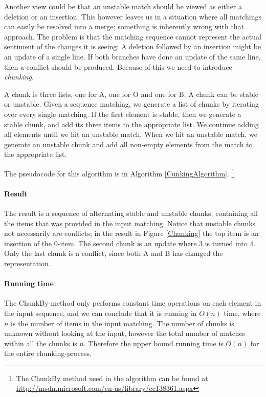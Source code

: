 \documentclass[11pt]{article}
\begin{document}
Another view could be that an unstable match should be viewed as either a deletion or an insertion. This however leaves us in a situation where all matchings can easily be resolved into a merge; something is inherently wrong with that approach. The problem is that the matching sequence cannot represent the actual sentiment of the changes it is seeing: A deletion followed by an insertion might be an update of a single line. If both branches have done an update of the same line, then a conflict should be produced. Because of this we need to introduce \textit{chunking}.

A chunk is three lists, one for A, one for O and one for B. A chunk can be stable or unstable. Given a sequence matching, we generate a list of chunks by iterating over every single matching. If the first element is stable, then we generate a stable chunk, and add its three items to the appropriate list. We continue adding all elements until we hit an unstable match. When we hit an unstable match, we generate an unstable chunk and add all non-empty elements from the match to the appropriate list.

The pseudocode for this algorithm is in Algorithm \ref{CunkingAlgorithm}. \footnote{The ChunkBy method used in the algorithm can be found at \url{http://msdn.microsoft.com/en-us/library/cc138361.aspx}}

\paragraph{Result} The result is a sequence of alternating stable and unstable chunks, containing all the items that was provided in the input matching. Notice that unstable chunks not necessarily are conflicts; in the result in Figure \ref{Chunking} the top item is an insertion of the $0$-item. The second chunk is an update where $3$ is turned into $4$. Only the last chunk is a conflict, since both A and B has changed the representation. 

\paragraph{Running time} The ChunkBy-method only performs constant time operations on each element in the input sequence, and we can conclude that it is running in $O(n)$ time, where $n$ is the number of items in the input matching. The number of chunks is unknown without looking at the input, however the total number of matches within all the chunks is $n$. Therefore the upper bound running time is $O(n)$ for the entire chunking-process.
\end{document}

